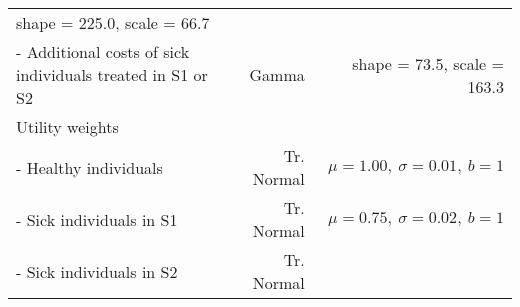\documentclass[
]{article}
\begin{document}
\begin{longtable}[]{@{}lrr@{}}
\begin{minipage}[t]{0.42\columnwidth}
shape = 225.0, scale = 66.7\strut
\end{minipage}\tabularnewline
\begin{minipage}[t]{0.32\columnwidth}\raggedright
- Additional costs of sick individuals treated in S1 or S2\strut
\end{minipage} & \begin{minipage}[t]{0.17\columnwidth}\raggedleft
Gamma\strut
\end{minipage} & \begin{minipage}[t]{0.42\columnwidth}\raggedleft
shape = 73.5, scale = 163.3\strut
\end{minipage}\tabularnewline
\begin{minipage}[t]{0.32\columnwidth}\raggedright
Utility weights\strut
\end{minipage} & \begin{minipage}[t]{0.17\columnwidth}\raggedleft
\strut
\end{minipage} & \begin{minipage}[t]{0.42\columnwidth}\raggedleft
\strut
\end{minipage}\tabularnewline
\begin{minipage}[t]{0.32\columnwidth}\raggedright
- Healthy individuals\strut
\end{minipage} & \begin{minipage}[t]{0.17\columnwidth}\raggedleft
Tr. Normal\strut
\end{minipage} & \begin{minipage}[t]{0.42\columnwidth}\raggedleft
\(\mu = 1.00, \ \sigma = 0.01, \ b = 1\)\strut
\end{minipage}\tabularnewline
\begin{minipage}[t]{0.32\columnwidth}\raggedright
- Sick individuals in S1\strut
\end{minipage} & \begin{minipage}[t]{0.17\columnwidth}\raggedleft
Tr. Normal\strut
\end{minipage} & \begin{minipage}[t]{0.42\columnwidth}\raggedleft
\(\mu = 0.75, \ \sigma = 0.02, \ b = 1\)\strut
\end{minipage}\tabularnewline
\begin{minipage}[t]{0.32\columnwidth}\raggedright
- Sick individuals in S2\strut
\end{minipage} & \begin{minipage}[t]{0.17\columnwidth}\raggedleft
Tr. Normal\strut
\end{minipage} & \begin{minipage}[t]{0.42\columnwidth}\raggedleft

\end{minipage}
\end{longtable}
\end{document}
